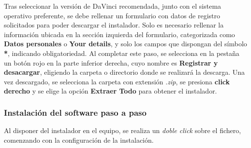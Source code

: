 Tras seleccionar la versión de DaVinci recomendada, junto con el sistema operativo preferente, 
se debe rellenar un formulario con datos de registro solicitados para poder descargar el 
instalador. Solo es necesario rellenar la información ubicada en la sección izquierda del 
formulario, categorizada como \textbf{Datos personales} o \textbf{Your details}, 
y solo los campos que dispongan del símbolo \textbf{*}, indicando obligatoriedad.
Al completar este paso, se selecciona en la pestaña un botón rojo en la parte inferior derecha, 
cuyo nombre es \textbf{Registrar y desacargar}, eligiendo la carpeta o directorio donde 
se realizará la descarga. Una vez descargado, se selecciona la carpeta con extensión \textit{.zip}, 
se presiona \textbf{click derecho} y se elige la opción \textbf{Extraer Todo} para obtener 
el instalador.

\subsubsection*{Instalación del software paso a paso}
Al disponer del instalador en el equipo, se realiza un \textit{doble click} sobre el fichero, 
comenzando con la configuración de la instalación.

